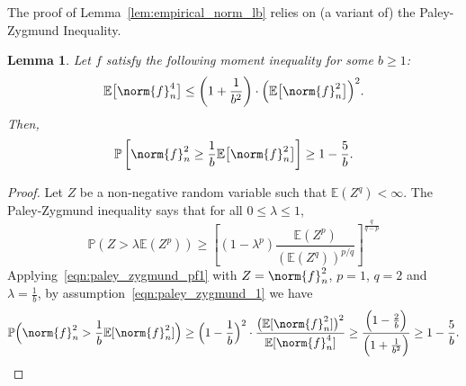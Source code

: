 \documentclass{article}
\newcommand{\1}{\mathbf{1}}
\newcommand{\Ebb}{\mathbb{E}}
\theoremstyle{alden}
\theoremstyle{aldenthm}
\newtheorem{lemma}{Lemma}
\theoremstyle{definition}
\theoremstyle{remark}
\begin{document}
The proof of Lemma~\ref{lem:empirical_norm_lb} relies on (a variant of) the Paley-Zygmund Inequality.
\begin{lemma}
	\label{lem:paley_zygmund}
	Let $f$ satisfy the following moment inequality for some $b \geq 1$:
	\begin{equation}
	\label{eqn:paley_zygmund_1}
	\Ebb\bigl[\norm{f}_n^4\bigr] \leq \left(1 + \frac{1}{b^2}\right)\cdot\Bigl(\Ebb\bigl[\norm{f}_n^2\bigr]\Bigr)^2.
	\end{equation}
	Then,
	\begin{equation}
	\label{eqn:paley_zygmund_2}
	\mathbb{P}\left[\norm{f}_n^2 \geq \frac{1}{b} \Ebb\bigl[\norm{f}_n^2\bigr]\right] \geq 1 - \frac{5}{b}.
	\end{equation}
\end{lemma}
\begin{proof}
	Let $Z$ be a non-negative random variable such that $\mathbb{E}(Z^q) < \infty$. The Paley-Zygmund inequality says that for all $0 \leq \lambda \leq 1$,
	\begin{equation}
	\label{eqn:paley_zygmund_pf1}
	\mathbb{P}(Z > \lambda \mathbb{E}(Z^p)) \geq \left[(1 - \lambda^p) \frac{\mathbb{E}(Z^p)}{(\mathbb{E}(Z^q))^{p/q}}\right]^{\frac{q}{q - p}}
	\end{equation}
	Applying~\eqref{eqn:paley_zygmund_pf1} with $Z = \norm{f}_n^2$, $p = 1$, $q = 2$ and $\lambda = \frac{1}{b}$, by assumption~\eqref{eqn:paley_zygmund_1} we have
	\begin{equation*}
	\mathbb{P}\Bigl(\norm{f}_n^2 > \frac{1}{b} \mathbb{E}[\norm{f}_n^2]\Bigr) \geq \Bigl(1 - \frac{1}{b}\Bigr)^2 \cdot  \frac{\bigl(\mathbb{E}[\norm{f}_n^2]\bigr)^2}{\mathbb{E}[\norm{f}_n^4]} \geq \frac{\Bigl(1 - \frac{2}{b}\Bigr)}{\Bigl(1 + \frac{1}{b^2}\Bigr)} \geq 1 - \frac{5}{b}.
	\end{equation*}
\end{proof}
\end{document}
